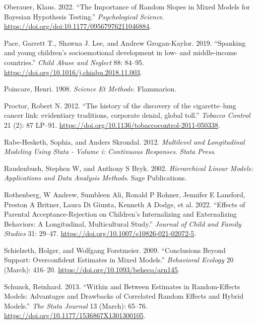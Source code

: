 \documentclass[
  letterpaper,
  DIV=11,
  numbers=noendperiod]{scrreprt}
\newlength{\cslhangindent}
\newlength{\cslentryspacingunit} %
\newenvironment{CSLReferences}[2] %
 {%
  \setlength{\parindent}{0pt}
  \ifodd #1
  \let\oldpar\par
  \def\par{\hangindent=\cslhangindent\oldpar}
  \fi
  \setlength{\parskip}{#2\cslentryspacingunit}
 }%
 {}
\begin{document}
\begin{CSLReferences}{1}{0}
\leavevmode{}%
Oberauer, Klaus. 2022. {``{The Importance of Random Slopes in Mixed
Models for Bayesian Hypothesis Testing}.''} \emph{Psychological
Science}. \url{https://doi.org/doi:10.1177/09567976211046884}.

\leavevmode{}%
Pace, Garrett T., Shawna J. Lee, and Andrew Grogan-Kaylor. 2019.
{``{Spanking and young children's socioemotional development in low- and
middle-income countries}.''} \emph{Child Abuse and Neglect} 88: 84--95.
\url{https://doi.org/10.1016/j.chiabu.2018.11.003}.

\leavevmode{}%
Poincare, Henri. 1908. \emph{Science Et Methode}. Flammarion.

\leavevmode{}%
Proctor, Robert N. 2012. {``{The history of the discovery of the
cigarette--lung cancer link: evidentiary traditions, corporate denial,
global toll}.''} \emph{Tobacco Control} 21 (2): 87 LP--91.
\url{https://doi.org/10.1136/tobaccocontrol-2011-050338}.

\leavevmode{}%
Rabe-Hesketh, Sophia, and Anders Skrondal. 2012. \emph{Multilevel and
Longitudinal Modeling Using Stata - Volume i: Continuous Responses}.
\emph{Stata Press}.

\leavevmode{}%
Raudenbush, Stephen W, and Anthony S Bryk. 2002. \emph{Hierarchical
Linear Models: Applications and Data Analysis Methods}. Sage
Publications.

\leavevmode{}%
Rothenberg, W Andrew, Sumbleen Ali, Ronald P Rohner, Jennifer E
Lansford, Preston A Britner, Laura Di Giunta, Kenneth A Dodge, et al.
2022. {``Effects of Parental Acceptance-Rejection on Children's
Internalizing and Externalizing Behaviors: A Longitudinal, Multicultural
Study.''} \emph{Journal of Child and Family Studies} 31: 29--47.
\url{https://doi.org/10.1007/s10826-021-02072-5}.

\leavevmode{}%
Schielzeth, Holger, and Wolfgang Forstmeier. 2009. {``Conclusions Beyond
Support: Overconfident Estimates in Mixed Models.''} \emph{Behavioral
Ecology} 20 (March): 416--20.
\url{https://doi.org/10.1093/beheco/arn145}.

\leavevmode{}%
Schunck, Reinhard. 2013. {``Within and Between Estimates in
Random-Effects Models: Advantages and Drawbacks of Correlated Random
Effects and Hybrid Models.''} \emph{The Stata Journal} 13 (March):
65--76. \url{https://doi.org/10.1177/1536867X1301300105}.


\end{CSLReferences}
\end{document}
